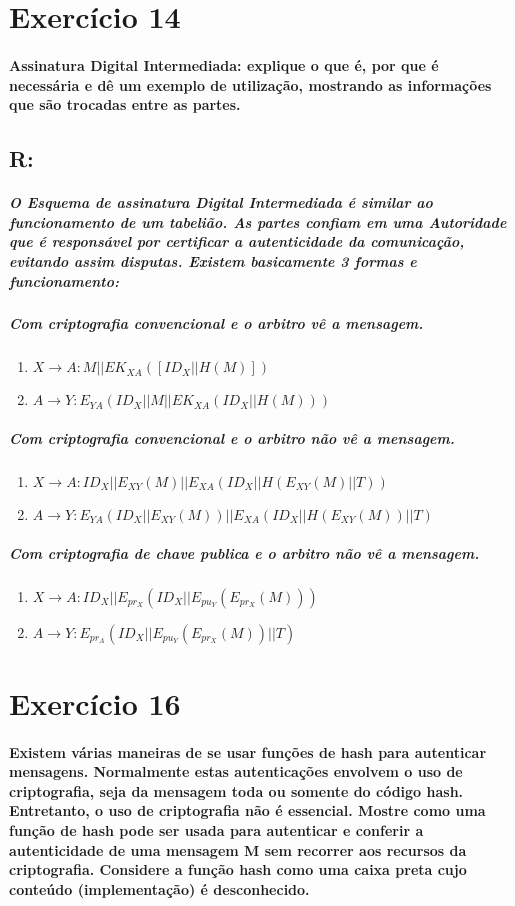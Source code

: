 \documentclass[10pt,a4paper]{report}
\begin{document}
\section*{Exercício 14}
\paragraph{Assinatura Digital Intermediada: explique o que é, por que é necessária e dê um exemplo de utilização, mostrando as informações que são trocadas entre as partes.}
\subsection*{R:}
\subparagraph{O Esquema de assinatura Digital Intermediada é similar ao funcionamento de um tabelião. As partes confiam em uma Autoridade que é responsável por certificar a autenticidade da comunicação, evitando assim disputas. Existem basicamente 3 formas e funcionamento:}
\subparagraph{Com criptografia convencional e o arbitro vê a mensagem. }
\begin{enumerate}
\item $X \rightarrow A: M||EK_{XA}([ID_X||H(M)])$
\item $A \rightarrow Y: E_{YA}(ID_X||M||EK_{XA}(ID_X||H(M))) $
\end{enumerate}

\subparagraph{Com criptografia convencional e o arbitro não vê a mensagem. }
\begin{enumerate}
\item $X \rightarrow A: ID_X||E_{XY}(M)||E_{XA}(ID_X||H(E_{XY}(M)||T))$
\item $A \rightarrow Y: E_{YA}(ID_X||E_{XY}(M))||E_{XA}(ID_X||H(E_{XY}(M))||T)$
\end{enumerate}

\subparagraph{Com criptografia de chave publica e o arbitro não vê a mensagem. }
\begin{enumerate}
\item $X \rightarrow A: ID_X||E_{pr_X}(ID_X||E_{pu_Y}(E_{pr_X}(M)))$
\item $A \rightarrow Y: E_{pr_A}(ID_X||E_{pu_Y}(E_{pr_X}(M))||T)$
\end{enumerate}

\section*{Exercício 16}
\paragraph{Existem várias maneiras de se usar funções de hash para autenticar mensagens. Normalmente estas autenticações envolvem o uso de criptografia, seja da mensagem toda ou somente do código hash. Entretanto, o uso de criptografia não é essencial. Mostre como uma função de hash pode ser usada para autenticar e conferir a autenticidade de uma mensagem M sem recorrer aos recursos da criptografia. Considere a função hash como uma caixa preta cujo conteúdo (implementação) é desconhecido.}
\end{document}
